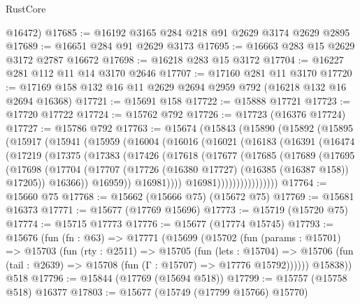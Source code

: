 \begin{lexlean}{RustCore}
\begin{coremodule}
      @16472)
@17685 := @16192 @3165 @284 @218 @91 @2629 @3174 @2629 @2895
@17689 := @16651 @284 @91 @2629 @3173
@17695 := @16663 @283 @15 @2629 @3172 @2787 @16672
@17698 := @16218 @283 @15 @3172
@17704 := @16227 @281 @112 @11 @14 @3170 @2646
@17707 := @17160 @281 @11 @3170
@17720 := @17169 @158 @132 @16 @11 @2629 @2694 @2959 @792 (@16218 @132 @16 @2694 @16368)
@17721 := @15691 @158
@17722 := @15888 @17721
@17723 := @17720 @17722
@17724 := @15762 @792
@17726 := @17723 (@16376 @17724)
@17727 := @15786 @792
@17763 := @15674
    (@15843
      (@15890
        (@15892
          (@15895
            (@15917
              (@15941
                (@15959
                  (@16004
                    (@16016
                      (@16021
                        (@16183
                          (@16391
                            (@16474
                              (@17219
                                (@17375
                                  (@17383
                                    (@17426
                                      (@17618
                                        (@17677
                                          (@17685
                                            (@17689
                                              (@17695
                                                (@17698
                                                  (@17704
                                                    (@17707
                                                      (@17726
                                                        (@16380 @17727)
                                                        (@16385 (@16387 @158))
                                                        @17205))
                                                    @16366))
                                                @16959))
                                            @16981))))
                                    @16981))))))))))))))))
@17764 := @15660 @75
@17768 := @15662 (@15666 @75) (@15672 @75)
@17769 := @15681 @16373
@17771 := @15677 (@17769 @15696)
@17773 := @15719 (@15720 @75)
@17774 := @15715 @17773
@17776 := @15677 (@17774 @15745)
@17793 := @15676
    (fun (fn : @63) =>
    @17771
      (@15699
        (@15702
          (fun (params : @15701) =>
          @15703
            (fun (rty : @2511) =>
            @15705
              (fun (lets : @15704) =>
              @15706 (fun (tail : @2639) => @15708 (fun (Γ : @15707) => @17776 @15792))))))
        @15838))
    @518
@17796 := @15844 (@17769 (@15694 @518))
@17799 := @15757 (@15758 @518) @16377
@17803 := @15677 (@15749 (@17799 @15766) @15770)

\end{coremodule}
\end{lexlean}
